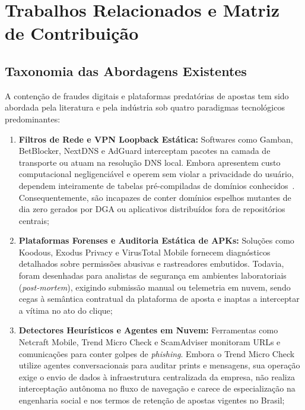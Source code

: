 \section{Trabalhos Relacionados e Matriz de Contribui\c{c}\~{a}o}
\label{sec:trabalhos_relacionados}

\subsection{Taxonomia das Abordagens Existentes}

A conten\c{c}\~{a}o de fraudes digitais e plataformas predat\'{o}rias de apostas tem sido abordada pela literatura e pela ind\'{u}stria sob quatro paradigmas tecnol\'{o}gicos predominantes:
\begin{enumerate}
    \item \textbf{Filtros de Rede e VPN Loopback Est\'{a}tica:} Softwares como Gamban, BetBlocker, NextDNS e AdGuard interceptam pacotes na camada de transporte ou atuam na resolu\c{c}\~{a}o DNS local. Embora apresentem custo computacional negligenci\'{a}vel e operem sem violar a privacidade do usu\'{a}rio, dependem inteiramente de tabelas pr\'{e}-compiladas de dom\'{i}nios conhecidos~\cite{zhauniarovich2018survey}. Consequentemente, s\~{a}o incapazes de conter dom\'{i}nios espelhos mutantes de dia zero gerados por DGA ou aplicativos distribu\'{i}dos fora de reposit\'{o}rios centrais;
    \item \textbf{Plataformas Forenses e Auditoria Est\'{a}tica de APKs:} Solu\c{c}\~{o}es como Koodous, Exodus Privacy e VirusTotal Mobile fornecem diagn\'{o}sticos detalhados sobre permiss\~{o}es abusivas e rastreadores embutidos. Todavia, foram desenhadas para analistas de seguran\c{c}a em ambientes laboratoriais (\textit{post-mortem}), exigindo submiss\~{a}o manual ou telemetria em nuvem, sendo cegas \`{a} sem\^{a}ntica contratual da plataforma de aposta e inaptas a interceptar a v\'{i}tima no ato do clique;
    \item \textbf{Detectores Heur\'{i}sticos e Agentes em Nuvem:} Ferramentas como Netcraft Mobile, Trend Micro Check e ScamAdviser monitoram URLs e comunica\c{c}\~{o}es para conter golpes de \textit{phishing}. Embora o Trend Micro Check utilize agentes conversacionais para auditar prints e mensagens, sua opera\c{c}\~{a}o exige o envio de dados \`{a} infraestrutura centralizada da empresa, n\~{a}o realiza intercepta\c{c}\~{a}o aut\^{o}noma no fluxo de navega\c{c}\~{a}o e carece de especializa\c{c}\~{a}o na engenharia social e nos termos de reten\c{c}\~{a}o de apostas vigentes no Brasil;

\end{enumerate}
